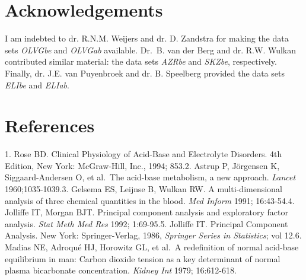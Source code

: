 \documentclass[
  12pt,
  a4paperpaper,
]{report}
\begin{document}
\hypertarget{acknowledgements}{%
\section{Acknowledgements}\label{acknowledgements}}

I am indebted to dr. R.N.M. Weijers and dr. D. Zandstra for making the
data sets \emph{OLVGbe} and \emph{OLVGab} available. Dr.~B. van der Berg
and dr. R.W. Wulkan contributed similar material: the data sets
\emph{AZRbe} and \emph{SKZbe}, respectively. Finally, dr. J.E. van
Puyenbroek and dr. B. Speelberg provided the data sets \emph{ELIbe} and
\emph{ELIab}.

\hypertarget{references-1}{%
\section{References}\label{references-1}}

1. Rose BD. Clinical Physiology of Acid-Base and Electrolyte Disorders.
4th Edition, New York: McGraw-Hill, Inc., 1994; 853.2. Astrup P,
Jörgensen K, Siggaard-Andersen O, et al.~The acid-base metabolism, a new
approach. \emph{Lancet} 1960;1035-1039.3. Gelsema ES, Leijnse B, Wulkan
RW. A multi-dimensional analysis of three chemical quantities in the
blood. \emph{Med Inform} 1991; 16:43-54.4. Jolliffe IT, Morgan BJT.
Principal component analysis and exploratory factor analysis. \emph{Stat
Meth Med Res} 1992; 1:69-95.5. Jolliffe IT. Principal Component
Analysis. New York: Springer-Verlag, 1986, \emph{Springer Series in
Statistics}; vol 12.6. Madias NE, Adroqué HJ, Horowitz GL, et al.~A
redefinition of normal acid-base equilibrium in man: Carbon dioxide
tension as a key determinant of normal plasma bicarbonate concentration.
\emph{Kidney Int} 1979; 16:612-618.
\end{document}
